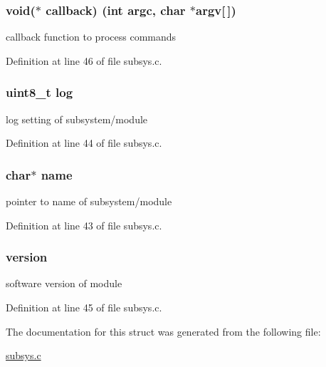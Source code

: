 \subsubsection[{callback}]{\setlength{\rightskip}{0pt plus 5cm}void($\ast$ callback) (int argc, char $\ast$argv\mbox{[}$\,$\mbox{]})}\label{structsubsystem__t_a0ca91c56697bfb67aa0d631ae0d27085}


callback function to process commands 



Definition at line 46 of file subsys.\+c.

\hypertarget{structsubsystem__t_ae001c74b249ea53b90cc573c1ca7699b}{}
\subsubsection[{log}]{\setlength{\rightskip}{0pt plus 5cm}uint8\+\_\+t log}\label{structsubsystem__t_ae001c74b249ea53b90cc573c1ca7699b}
log setting of subsystem/module 

Definition at line 44 of file subsys.\+c.

\hypertarget{structsubsystem__t_a5ac083a645d964373f022d03df4849c8}{}
\subsubsection[{name}]{\setlength{\rightskip}{0pt plus 5cm}char$\ast$ name}\label{structsubsystem__t_a5ac083a645d964373f022d03df4849c8}
pointer to name of subsystem/module 

Definition at line 43 of file subsys.\+c.

\hypertarget{structsubsystem__t_a0a8052c72b7c10557400c8df1e52946e}{}
\subsubsection[{version}]{ version}\label{structsubsystem__t_a0a8052c72b7c10557400c8df1e52946e}
software version of module 

Definition at line 45 of file subsys.\+c.



The documentation for this struct was generated from the following file\+:\begin{DoxyCompactItemize}
\item 
\hyperlink{subsys_8c}{subsys.\+c}\end{DoxyCompactItemize}
